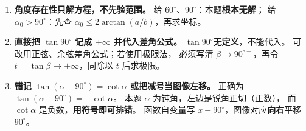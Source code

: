 \begin{trapbox}
\begin{enumerate}
\item \textbf{角度存在性只解方程，不先验范围。}
给 $60^\circ$、$90^\circ$：本题\textbf{根本无解}；
给 $\alpha_0>90^\circ$：先查
$\alpha_0\le2\arctan(a/b)$，再求坐标。

\item \textbf{直接把 $\tan90^\circ$ 记成 $+\infty$ 并代入差角公式。}
$\tan90^\circ$\textbf{无定义}，不能代入。
可改用正弦、余弦差角公式；若使用极限法，
必须写清 $\beta\to90^{\circ-}$，再令
$t=\tan\beta\to+\infty$，同除以 $t$ 后求极限。

\item \textbf{错记 $\tan(\alpha-90^\circ)=\cot\alpha$ 或把减号当图像左移。}
正确为 $\tan(\alpha-90^\circ)=-\cot\alpha$。
本题 $\alpha$ 为钝角，左边是锐角正切（正数），
而 $\cot\alpha$ 是负数，\textbf{用符号即可排错}。
函数自变量写 $x-90^\circ$，图像对应\textbf{向右}平移 $90^\circ$。
\end{enumerate}
\end{trapbox}

